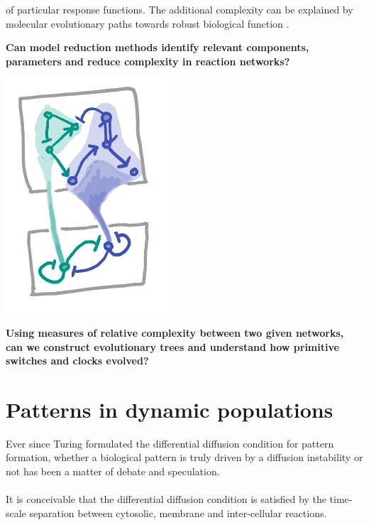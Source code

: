 \documentclass[a0,portrait]{a0poster}
\begin{document}
\begin{multicols}{3}
of particular response functions. The additional complexity can be
explained by molecular evolutionary paths towards robust biological function
\cite{}.
\\
\begin{tcolorbox}[boxrule=2pt,arc=3.4pt,boxsep=2mm]
\begin{center}\color{DarkRed}
\textbf{Can model reduction methods \cite{} identify relevant components,
parameters \cite{} and reduce complexity in reaction networks?}
\end{center}
\end{tcolorbox}
\begin{center}
\includegraphics[width=0.6\linewidth]{reduction}
\end{center}
\begin{tcolorbox}[boxrule=2pt,arc=3.4pt,boxsep=2mm]
\begin{center}\color{DarkRed}
\textbf{Using measures of relative complexity between two given networks,
can we construct evolutionary trees and understand how primitive switches
and clocks evolved?}
\end{center}
\end{tcolorbox}
\vfill\null
\columnbreak
\section{Patterns in dynamic populations}
Ever since Turing formulated the differential diffusion condition \cite{}
for pattern formation, whether a biological pattern is truly driven by a
diffusion instability or not has been a matter of debate and speculation.
\\\\
It is conceivable that the differential diffusion condition is satisfied
by the time-scale separation between cytosolic, membrane and inter-cellular
reactions.


\end{multicols}
\end{document}
